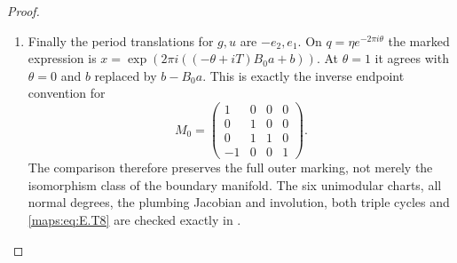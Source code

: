 \begin{proof}
\begin{enumerate}[label=\arabic*.,leftmargin=*]
\item Finally the period translations for $g,u$ are $-e_2,e_1$.
On $q=\eta e^{-2\pi i\theta}$ the marked expression is
$x=\exp(2\pi i((-\theta+iT)B_0a+b))$.
At $\theta=1$ it agrees with $\theta=0$ and
$b$ replaced by $b-B_0a$.  This is exactly the inverse
endpoint convention for
\[
 M_0=\begin{pmatrix}
 1&0&0&0\\0&1&0&0\\0&1&1&0\\-1&0&0&1
 \end{pmatrix}.
 \tag{E.T8}\label{maps:eq:E.T8}
\]
The comparison therefore preserves the full outer marking,
not merely the isomorphism class of the boundary manifold.
The six unimodular charts, all normal degrees, the plumbing
Jacobian and involution, both triple cycles and \eqref{maps:eq:E.T8} are
checked exactly in .
\end{enumerate}
\end{proof}



